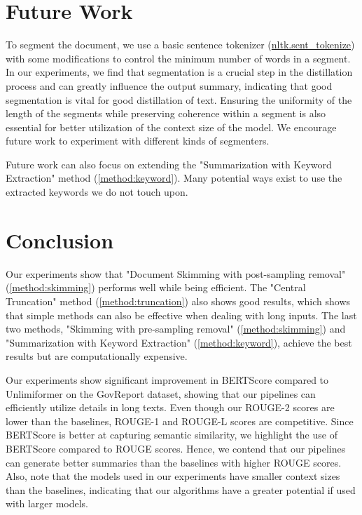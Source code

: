 \section{Future Work}
\label{sec:future-work}

To segment the document, we use a basic sentence tokenizer (\href{https://www.nltk.org/api/nltk.tokenize.sent_tokenize.html}{nltk.sent\_tokenize}) with some modifications to control the minimum number of words in a segment.
In our experiments, we find that segmentation is a crucial step in the distillation process and can greatly influence the output summary, indicating that good segmentation is vital for good distillation of text.
Ensuring the uniformity of the length of the segments while preserving coherence within a segment is also essential for better utilization of the context size of the model.
We encourage future work to experiment with different kinds of segmenters.

Future work can also focus on extending the "Summarization with Keyword Extraction" method (\autoref{method:keyword}).
Many potential ways exist to use the extracted keywords we do not touch upon.


\section{Conclusion}
\label{sec:conclusion}

Our experiments show that "Document Skimming with post-sampling removal" (\autoref{method:skimming}) performs well while being efficient.
The "Central Truncation" method (\autoref{method:truncation}) also shows good results, which shows that simple methods can also be effective when dealing with long inputs.
The last two methods, "Skimming with pre-sampling removal" (\autoref{method:skimming}) and "Summarization with Keyword Extraction" (\autoref{method:keyword}), achieve the best results but are computationally expensive.

Our experiments show significant improvement in BERTScore compared to Unlimiformer \cite{bertsch2023unlimiformer} on the GovReport dataset, showing that our pipelines can efficiently utilize details in long texts.
Even though our ROUGE-2 scores are lower than the baselines, ROUGE-1 and ROUGE-L scores are competitive.
Since BERTScore is better at capturing semantic similarity, we highlight the use of BERTScore compared to ROUGE scores.
Hence, we contend that our pipelines can generate better summaries than the baselines with higher ROUGE scores.
Also, note that the models used in our experiments have smaller context sizes than the baselines, indicating that our algorithms have a greater potential if used with larger models.


